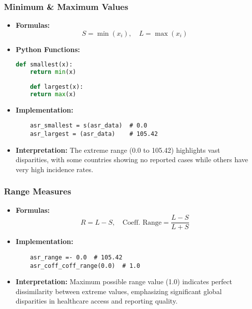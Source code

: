 \begin{frame}[fragile]
    \frametitle{Minimum \& Maximum Values}
    \begin{itemize}
        \item \textbf{Formulas:}
              \[
                  S = \min(x_i),\quad L = \max(x_i)
              \]

        \item \textbf{Python Functions:}
              \begin{lstlisting}[language=Python, breaklines=true]
    def smallest(x):
    return min(x)
    
    def largest(x):
    return max(x)
                            \end{lstlisting}

        \item \textbf{Implementation:}
              \begin{lstlisting}
    asr_smallest = s(asr_data)  # 0.0
    asr_largest = (asr_data)    # 105.42
                            \end{lstlisting}

        \item \textbf{Interpretation:} The extreme range (\SI{0.0}{\perthousand} to \SI{105.42}{\perthousand}) highlights vast disparities, with some countries showing no reported cases while others have very high incidence rates.
    \end{itemize}
\end{frame}

\begin{frame}[fragile]
    \frametitle{Range Measures}
    \begin{itemize}
        \item \textbf{Formulas:}
              \[
                  R = L - S,\quad \text{Coeff. Range} = \frac{L - S}{L + S}
              \]

        \item \textbf{Implementation:}
              \begin{lstlisting}
    asr_range =- 0.0  # 105.42
    asr_coff_coff_range(0.0)  # 1.0
                                \end{lstlisting}

        \item \textbf{Interpretation:} Maximum possible range value (1.0) indicates perfect dissimilarity between extreme values, emphasizing significant global disparities in healthcare access and reporting quality.
    \end{itemize}
\end{frame}

